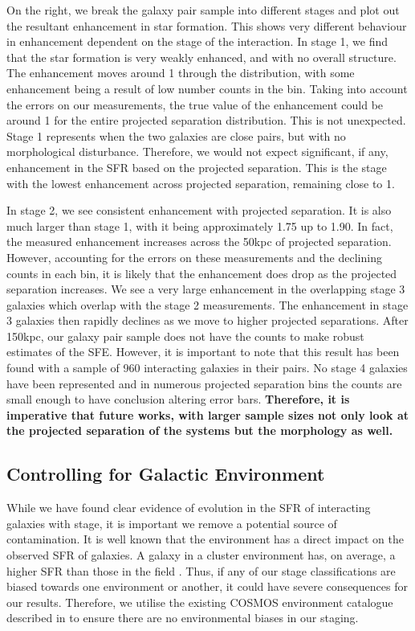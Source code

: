 \documentclass[fleqn,usenatbib]{mnras}
\begin{document}
On the right, we break the galaxy pair sample into different stages and plot out the resultant enhancement in star formation. This shows very different behaviour in enhancement dependent on the stage of the interaction. In stage 1, we find that the star formation is very weakly enhanced, and with no overall structure. The enhancement moves around 1 through the distribution, with some enhancement being a result of low number counts in the bin. Taking into account the errors on our measurements, the true value of the enhancement could be around 1 for the entire projected separation distribution. This is not unexpected. Stage 1 represents when the two galaxies are close pairs, but with no morphological disturbance. Therefore, we would not expect significant, if any, enhancement in the SFR based on the projected separation. This is the stage with the lowest enhancement across projected separation, remaining close to 1.

In stage 2, we see consistent enhancement with projected separation. It is also much larger than stage 1, with it being approximately 1.75 up to 1.90. In fact, the measured enhancement increases across the 50kpc of projected separation. However, accounting for the errors on these measurements and the declining counts in each bin, it is likely that the enhancement does drop as the projected separation increases. We see a very large enhancement in the overlapping stage 3 galaxies which overlap with the stage 2 measurements. The enhancement in stage 3 galaxies then rapidly declines as we move to higher projected separations. After 150kpc, our galaxy pair sample does not have the counts to make robust estimates of the SFE. However, it is important to note that this result has been found with a sample of 960 interacting galaxies in their pairs. No stage 4 galaxies have been represented and in numerous projected separation bins the counts are small enough to have conclusion altering error bars. \textbf{Therefore, it is imperative that future works, with larger sample sizes not only look at the projected separation of the systems but the morphology as well.}

\subsection{Controlling for Galactic Environment} \label{sec:env-cont}
\noindent While we have found clear evidence of evolution in the SFR of interacting galaxies with stage, it is important we remove a potential source of contamination. It is well known that the environment has a direct impact on the observed SFR of galaxies. A galaxy in a cluster environment has, on average, a higher SFR than those in the field \citep{2006MNRAS.373..469B}. Thus, if any of our stage classifications are biased towards one environment or another, it could have severe consequences for our results. Therefore, we utilise the existing COSMOS environment catalogue described in \citet{2017ApJ...837...16D} to ensure there are no environmental biases in our staging. 
\end{document}
